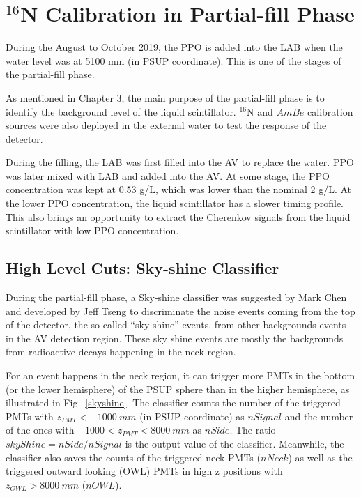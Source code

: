 \section{$^{16}$N Calibration in Partial-fill Phase}

During the August to October 2019, the PPO is added into the LAB when the water level was at 5100 mm (in PSUP coordinate). This is one of the stages of the partial-fill phase.

As mentioned in Chapter 3, the main purpose of the partial-fill phase is to identify the background level of the liquid scintillator. $^{16}$N and $AmBe$ calibration sources were also deployed in the external water to test the response of the detector. 

During the filling, the LAB was first filled into the AV to replace the water. PPO was later mixed with LAB and added into the AV. At some stage, the PPO concentration was kept at 0.53 g/L, which was lower than the nominal 2 g/L. At the lower PPO concentration, the liquid scintillator has a slower timing profile. This also brings an opportunity to extract the Cherenkov signals from the liquid scintillator with low PPO concentration.

\subsection{High Level Cuts: Sky-shine Classifier}
During the partial-fill phase, a Sky-shine classifier was suggested by Mark Chen and developed by Jeff Tseng to discriminate the noise events coming from the top of the detector, the so-called ``sky shine'' events, from other backgrounds events in the AV detection region\cite{skyshine}. These sky shine events are mostly the backgrounds from radioactive decays happening in the neck region. 

For an event happens in the neck region, it can trigger more PMTs in the bottom (or 
the lower hemisphere) of the PSUP sphere than in the higher hemisphere, as illustrated in Fig.~\ref{skyshine}. The classifier counts the number of the triggered PMTs with $z_{PMT}<-1000~mm$ (in PSUP coordinate) as $nSignal$ and the number of the ones with $-1000<z_{PMT}<8000~mm$ as $nSide$. The ratio $skyShine=nSide/nSignal$ is the output value of the classifier. Meanwhile, the classifier also saves the counts of the triggered neck PMTs ($nNeck$) as well as the triggered outward looking (OWL) PMTs in high z positions with $z_{OWL}>8000~mm$ ($nOWL$).

